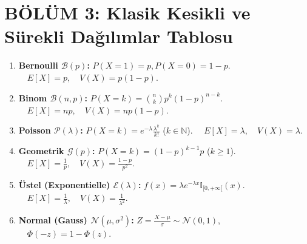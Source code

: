 \documentclass[11pt,a4paper]{article}
\begin{document}
\section*{BÖLÜM 3: Klasik Kesikli ve Sürekli Dağılımlar Tablosu}

\begin{tcolorbox}[colback=teal!5!white,colframe=teal!75!black,title=\textbf{Standart Dağılımlar, Beklenen Değer $E[X]$ ve Varyans $V(X)$}]
\begin{enumerate}[leftmargin=*]
    \item \textbf{Bernoulli $\mathcal{B}(p)$:} $P(X=1)=p, P(X=0)=1-p$. $\quad E[X] = p, \quad V(X) = p(1-p)$.
    \item \textbf{Binom $\mathcal{B}(n, p)$:} $P(X=k) = \binom{n}{k} p^k (1-p)^{n-k}$. $\quad E[X] = np, \quad V(X) = np(1-p)$.
    \item \textbf{Poisson $\mathcal{P}(\lambda)$:} $P(X=k) = e^{-\lambda} \frac{\lambda^k}{k!}$ ($k \in \mathbb{N}$). $\quad E[X] = \lambda, \quad V(X) = \lambda$.
    \item \textbf{Geometrik $\mathcal{G}(p)$:} $P(X=k) = (1-p)^{k-1} p$ ($k \ge 1$). $\quad E[X] = \frac{1}{p}, \quad V(X) = \frac{1-p}{p^2}$.
    \item \textbf{Üstel (Exponentielle) $\mathcal{E}(\lambda)$:} $f(x) = \lambda e^{-\lambda x} \mathbb{I}_{[0, +\infty[}(x)$. $\quad E[X] = \frac{1}{\lambda}, \quad V(X) = \frac{1}{\lambda^2}$.
    \item \textbf{Normal (Gauss) $\mathcal{N}(\mu, \sigma^2)$:} $Z = \frac{X-\mu}{\sigma} \sim \mathcal{N}(0, 1)$, $\quad \Phi(-z) = 1 - \Phi(z)$.
\end{enumerate}
\end{tcolorbox}
\end{document}
